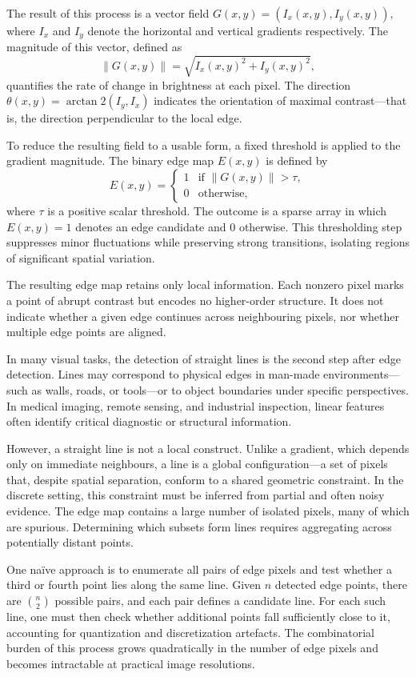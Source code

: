 The result of this process is a vector field $G(x, y) = (I_x(x, y), I_y(x, y))$, where $I_x$ and $I_y$ denote the horizontal and vertical gradients respectively. The magnitude of this vector, defined as
\[
\|G(x, y)\| = \sqrt{I_x(x, y)^2 + I_y(x, y)^2},
\]
quantifies the rate of change in brightness at each pixel. The direction $\theta(x, y) = \arctan2(I_y, I_x)$ indicates the orientation of maximal contrast—that is, the direction perpendicular to the local edge.

To reduce the resulting field to a usable form, a fixed threshold is applied to the gradient magnitude. The binary edge map $E(x, y)$ is defined by
\[
E(x, y) =
\begin{cases}
1 & \text{if } \|G(x, y)\| > \tau, \\
0 & \text{otherwise},
\end{cases}
\]
where $\tau$ is a positive scalar threshold. The outcome is a sparse array in which $E(x, y) = 1$ denotes an edge candidate and $0$ otherwise. This thresholding step suppresses minor fluctuations while preserving strong transitions, isolating regions of significant spatial variation.

The resulting edge map retains only local information. Each nonzero pixel marks a point of abrupt contrast but encodes no higher-order structure. It does not indicate whether a given edge continues across neighbouring pixels, nor whether multiple edge points are aligned.

In many visual tasks, the detection of straight lines is the second step after edge detection. Lines may correspond to physical edges in man-made environments—such as walls, roads, or tools—or to object boundaries under specific perspectives. In medical imaging, remote sensing, and industrial inspection, linear features often identify critical diagnostic or structural information.

However, a straight line is not a local construct. Unlike a gradient, which depends only on immediate neighbours, a line is a global configuration—a set of pixels that, despite spatial separation, conform to a shared geometric constraint. In the discrete setting, this constraint must be inferred from partial and often noisy evidence. The edge map contains a large number of isolated pixels, many of which are spurious. Determining which subsets form lines requires aggregating across potentially distant points.

One naïve approach is to enumerate all pairs of edge pixels and test whether a third or fourth point lies along the same line. Given $n$ detected edge points, there are $\binom{n}{2}$ possible pairs, and each pair defines a candidate line. For each such line, one must then check whether additional points fall sufficiently close to it, accounting for quantization and discretization artefacts. The combinatorial burden of this process grows quadratically in the number of edge pixels and becomes intractable at practical image resolutions.


